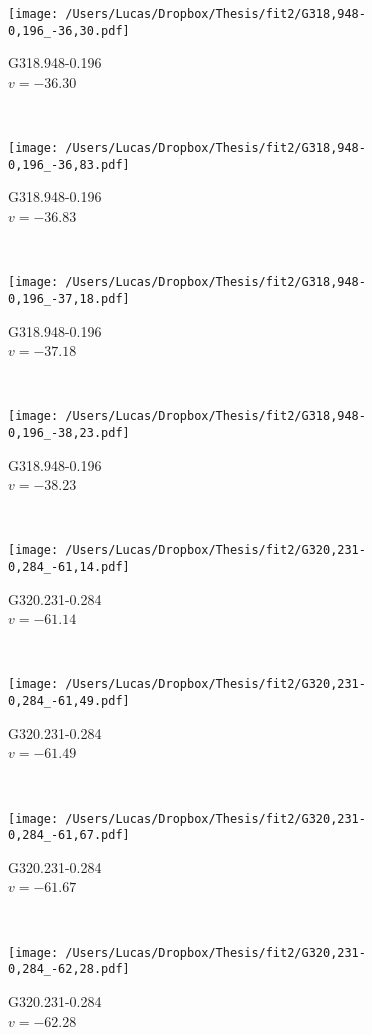 \begin{figure*}[t]\ContinuedFloat
	\centering
	\begin{subfigure}[t]{0.3\textwidth}
		\texttt{[image: /Users/Lucas/Dropbox/Thesis/fit2/G318,948-0,196\_-36,30.pdf]}
		\caption[]{G318.948-0.196\\$v=-36.30$\,\kms}
	\end{subfigure}
	~
	\begin{subfigure}[t]{0.3\textwidth}
		\texttt{[image: /Users/Lucas/Dropbox/Thesis/fit2/G318,948-0,196\_-36,83.pdf]}
		\caption[]{G318.948-0.196\\$v=-36.83$\,\kms}
	\end{subfigure}
	~
	\begin{subfigure}[t]{0.3\textwidth}
		\texttt{[image: /Users/Lucas/Dropbox/Thesis/fit2/G318,948-0,196\_-37,18.pdf]}
		\caption[]{G318.948-0.196\\$v=-37.18$\,\kms}
	\end{subfigure}
	~
	\begin{subfigure}[t]{0.3\textwidth}
		\texttt{[image: /Users/Lucas/Dropbox/Thesis/fit2/G318,948-0,196\_-38,23.pdf]}
		\caption[]{G318.948-0.196\\$v=-38.23$\,\kms}
	\end{subfigure}
	~
	\begin{subfigure}[t]{0.3\textwidth}
		\texttt{[image: /Users/Lucas/Dropbox/Thesis/fit2/G320,231-0,284\_-61,14.pdf]}
		\caption[]{G320.231-0.284\\$v=-61.14$\,\kms}
	\end{subfigure}
	~
	\begin{subfigure}[t]{0.3\textwidth}
		\texttt{[image: /Users/Lucas/Dropbox/Thesis/fit2/G320,231-0,284\_-61,49.pdf]}
		\caption[]{G320.231-0.284\\$v=-61.49$\,\kms}
	\end{subfigure}
	~
	\begin{subfigure}[t]{0.3\textwidth}
		\texttt{[image: /Users/Lucas/Dropbox/Thesis/fit2/G320,231-0,284\_-61,67.pdf]}
		\caption[]{G320.231-0.284\\$v=-61.67$\,\kms}
	\end{subfigure}
	~
	\begin{subfigure}[t]{0.3\textwidth}
		\texttt{[image: /Users/Lucas/Dropbox/Thesis/fit2/G320,231-0,284\_-62,28.pdf]}
		\caption[]{G320.231-0.284\\$v=-62.28$\,\kms}

\end{subfigure}
\end{figure*}

